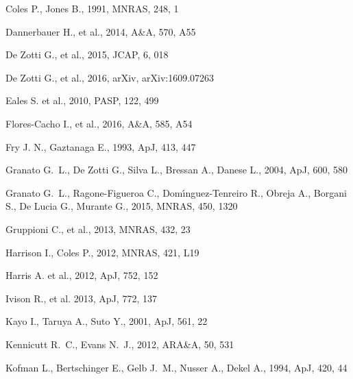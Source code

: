 \documentclass[useAMS,usenatbib]{mn2e}
\begin{document}
\begin{thebibliography}{}
 Coles P., Jones B., 1991, MNRAS, 248, 1

 Dannerbauer H., et al., 2014, A\&A, 570, A55

 De Zotti G., et al., 2015, JCAP, 6, 018

 De Zotti G., et al., 2016, arXiv, arXiv:1609.07263

 Eales S. et al., 2010, PASP, 122, 499

 Flores-Cacho I., et al., 2016, A\&A, 585, A54

 Fry J. N., Gaztanaga E., 1993, ApJ, 413, 447

 Granato G.~L., De Zotti G., Silva L., Bressan A., Danese L., 2004, ApJ, 600, 580

 Granato G.~L., Ragone-Figueroa C., Dom{\'{\i}}nguez-Tenreiro R., Obreja A., Borgani S., De Lucia G., Murante G., 2015, MNRAS, 450, 1320

 Gruppioni C., et al., 2013, MNRAS, 432, 23

 Harrison I., Coles P., 2012, MNRAS, 421, L19

 Harris A. et al., 2012, ApJ, 752, 152

 Ivison R., et al. 2013, ApJ, 772, 137

 Kayo I., Taruya A., Suto Y., 2001, ApJ, 561, 22

 Kennicutt R.~C., Evans N.~J., 2012, ARA\&A, 50, 531

 Kofman L., Bertschinger E., Gelb J.~M., Nusser A., Dekel A., 1994, ApJ, 420, 44


\end{thebibliography}
\end{document}
